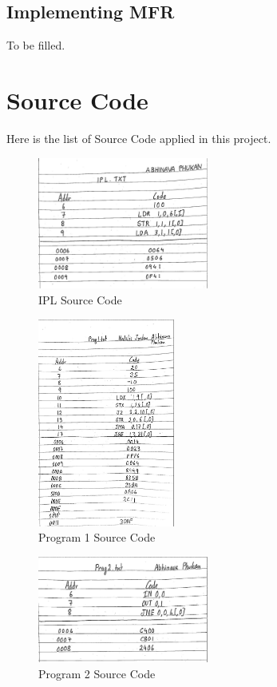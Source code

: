 \documentclass[10pt]{article}
\begin{document}
\subsection{Implementing MFR}
To be filled.
\section{Source Code}
Here is the list of Source Code applied in this project.
\begin{figure}[H]
  \centering
  \includegraphics[width=0.5\textwidth]{Pics/ipl.jpg}
  \caption{IPL Source Code}
  \label{fig:IPLCode}
\end{figure}
\begin{figure}[H]
  \centering
  \includegraphics[width=0.4\textwidth]{Pics/prog1.jpg}
  \caption{Program 1 Source Code}
  \label{fig:Program 1 Code}
\end{figure}
\begin{figure}[H]
  \centering
  \includegraphics[width=0.5\textwidth]{Pics/prog2.jpg}
  \caption{Program 2 Source Code}
  \label{fig:Program 2 Code}
\end{figure}
\end{document}
